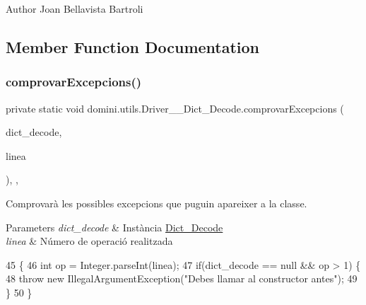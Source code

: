 \begin{DoxyAuthor}{Author}
Joan Bellavista Bartroli 
\end{DoxyAuthor}


\subsection{Member Function Documentation}
\mbox{\label{classdomini_1_1utils_1_1Driver____Dict__Decode_a41ddfd0f1473de9401aa7860cff2f3e8}} 
\subsubsection{\texorpdfstring{comprovar\+Excepcions()}{comprovarExcepcions()}}
{\footnotesize\ttfamily private static void domini.\+utils.\+Driver\+\_\+\+\_\+\+Dict\+\_\+\+Decode.\+comprovar\+Excepcions (\begin{DoxyParamCaption}\item[{\hyperlink{classdomini_1_1utils_1_1Dict__Decode}{Dict\+\_\+\+Decode}}]{dict\+\_\+decode,  }\item[{String}]{linea }\end{DoxyParamCaption})\hspace{0.3cm}{\ttfamily [inline]}, {\ttfamily [static]}, {\ttfamily [private]}}



Comprovarà les possibles excepcions que puguin apareixer a la classe. 


\begin{DoxyParams}{Parameters}
{\em dict\+\_\+decode} & Instància \hyperlink{classdomini_1_1utils_1_1Dict__Decode}{Dict\+\_\+\+Decode} \\
\hline
{\em linea} & Número de operació realitzada \\
\hline
\end{DoxyParams}

\begin{DoxyCode}
45                                                                                   \{
46         \textcolor{keywordtype}{int} op = Integer.parseInt(linea);
47         \textcolor{keywordflow}{if}(dict\_decode == null && op > 1) \{
48             \textcolor{keywordflow}{throw} \textcolor{keyword}{new} IllegalArgumentException(\textcolor{stringliteral}{"Debes llamar al constructor antes"});
49         \}
50     \}
\end{DoxyCode}
\mbox{\label{classdomini_1_1utils_1_1Driver____Dict__Decode_a5045c12e35617afd929dfeb30930d541}} 
